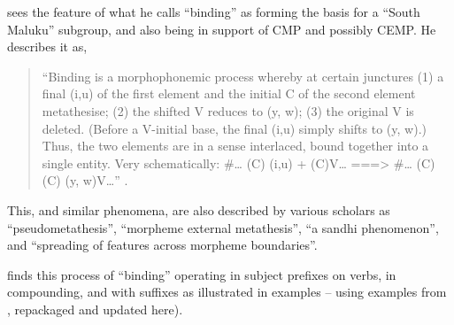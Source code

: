 \citet[250--254]{Mills1991} sees the feature of what he calls “binding”
as forming the basis for a “South Maluku” subgroup,
and also being in support of CMP and possibly CEMP.
He describes it as,

\begin{quote}
		“Binding is a morphophonemic process whereby at certain junctures
		(1) a final (i,u) of the first element
		and the initial C of the second element metathesise;
		(2) the shifted V reduces to (y, w);
		(3) the original V is deleted.
		(Before a V-initial base,
		the final (i,u) simply shifts to (y, w).)
		Thus, the two elements are in a sense interlaced,
		bound together into a single entity.
		Very schematically: {\#}{\ldots} (C) (i,u) + (C)V{\ldots} ===>
		{\#}{\ldots} (C){\0}(C) (y, w)V{\ldots}” \citep[250]{Mills1991}.
\end{quote}

This, and similar phenomena, are also described by various scholars
as “pseudometathesis”, “morpheme external metathesis”, “a sandhi phenomenon”,
and “spreading of features across morpheme boundaries”.

\citeauthor{Mills1991} finds this process of ``binding'' operating in subject prefixes
on verbs, in compounding, and with suffixes as illustrated in examples
-- using examples from \citet{Mills1991},
repackaged and updated here).



